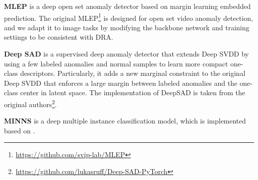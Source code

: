 \documentclass[10pt,twocolumn,letterpaper]{article}
\begin{document}
\noindent\textbf{MLEP} \cite{liu2019margin} is a deep open set anomaly detector based on margin learning embedded prediction. The original MLEP\footnote{\url{https://github.com/svip-lab/MLEP}} is designed for open set video anomaly detection, and we adapt it to image tasks by modifying the backbone network and training settings to be consistent with DRA.

\noindent\textbf{Deep SAD} \cite{ruff2019deep} is a supervised deep anomaly detector that extends Deep SVDD \cite{ruff2018deep} by using a few labeled anomalies and normal samples to learn more compact one-class descriptors. Particularly, it adds a new marginal constraint to the original Deep SVDD that enforces a large margin between labeled anomalies and the one-class center in latent space. The implementation of DeepSAD is taken from the original authors\footnote{\url{https://github.com/lukasruff/Deep-SAD-PyTorch}}.

\noindent\textbf{MINNS} \cite{wang2018revisiting} is a deep multiple instance classification model, which is implemented based on \cite{pang2021explainable}.
\end{document}
